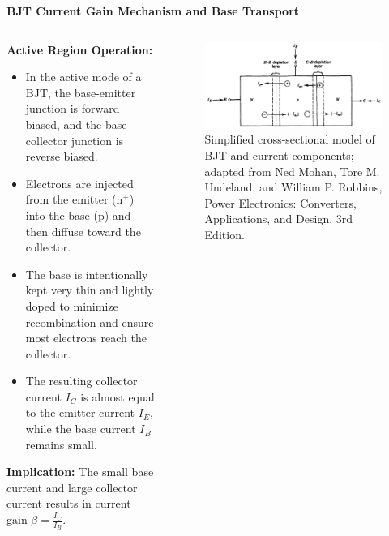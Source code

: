 \begin{frame}{\textbf{BJT Current Gain Mechanism and Base Transport}}
\begin{columns}
\begin{column}{0.6\textwidth}
\textbf{Active Region Operation:}
\begin{itemize}
    \item In the active mode of a BJT, the base-emitter junction is forward biased, and the base-collector junction is reverse biased.
    \item Electrons are injected from the emitter (n$^+$) into the base (p) and then diffuse toward the collector.
    \item The base is intentionally kept very thin and lightly doped to minimize recombination and ensure most electrons reach the collector.
    \item The resulting collector current $I_C$ is almost equal to the emitter current $I_E$, while the base current $I_B$ remains small.
\end{itemize}

\textbf{Implication:} The small base current and large collector current results in current gain $\beta = \frac{I_C}{I_B}$.
\end{column}

\begin{column}{0.4\textwidth}
\begin{figure}
    \centering
    \includegraphics[width=1\textwidth]{fig/lec04/cross_section_BJT.png}
    \caption{Simplified cross-sectional model of BJT and current components; adapted from Ned Mohan, Tore M. Undeland, and William P. Robbins, Power Electronics: Converters, Applications, and Design, 3rd Edition.}
\end{figure}
\end{column}
\end{columns}
\end{frame}


